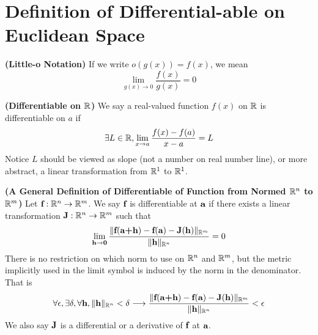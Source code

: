 \documentclass{report}
\begin{document}
\section{Definition of Differential-able on Euclidean Space} 
\begin{definition}
\label{4.2.1}
\textbf{(Little-o Notation)} If we write $o(g(x))=f(x)$, we mean
\begin{equation}
\lim_{g(x)\to 0}\frac{f(x)}{g(x)}=0
\end{equation}
\end{definition}
\begin{definition}
\label{4.2.2}
\textbf{(Differentiable on $\mathbb{R}$)} We say a real-valued function $f(x)$ on $\mathbb{R}$ is differentiable on $a$ if 
\begin{equation}
\exists L\in \mathbb{R}, \lim_{x \to a}\frac{f(x)-f(a)}{x-a}=L
\end{equation}
Notice $L$ should be viewed as slope (not a number on real number line), or more abstract, a linear transformation from $\mathbb{R}^1$ to  $\mathbb{R}^1$. 
\end{definition}
\begin{definition}
\label{4.2.3}
\textbf{(A General Definition of Differentiable of Function from Normed $\mathbb{R}^n$ to $\mathbb{R}^m$)} Let $\textbf{f}:\mathbb{R}^n\rightarrow \mathbb{R}^m$. We say $\textbf{f}$ is differentiable at $\textbf{a}$ if there exists a linear transformation $\textbf{J}:\mathbb{R}^n\rightarrow \mathbb{R}^m$ such that
\begin{equation}
\lim_{\textbf{h}\to \textbf{0}}\frac{\| \textbf{f}(\textbf{a+h})-\textbf{f}(\textbf{a})-\textbf{J}(\textbf{h}) \|_{\mathbb{R}^m}}{\| \textbf{h} \|_{\mathbb{R}^n}}=0
\end{equation}
There is no restriction on which norm to use on $\mathbb{R}^n$ and $\mathbb{R}^m$, but the metric implicitly used in the limit symbol is induced by the norm in the denominator. That is
\begin{equation}
\forall \epsilon, \exists \delta, \forall \textbf{h},\| \textbf{h} \|_{\mathbb{R}^n}<\delta \longrightarrow \frac{\| \textbf{f}(\textbf{a+h})-\textbf{f}(\textbf{a})-\textbf{J}(\textbf{h}) \|_{\mathbb{R}^m}}{\| \textbf{h} \|_{\mathbb{R}^n}}<\epsilon
\end{equation}
We also say $\textbf{J}$ is a differential or a derivative of $\textbf{f}$ at $\textbf{a}$.
\end{definition}
\end{document}
